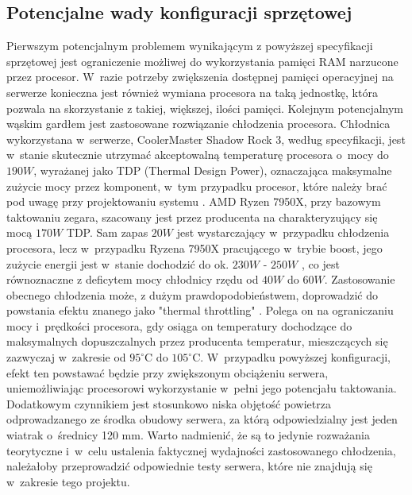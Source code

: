 \subsection{Potencjalne wady konfiguracji sprzętowej}
Pierwszym potencjalnym problemem wynikającym z powyższej specyfikacji sprzętowej jest ograniczenie możliwej do wykorzystania pamięci RAM narzucone przez procesor. W~razie potrzeby zwiększenia dostępnej pamięci operacyjnej na serwerze konieczna jest również wymiana procesora na taką jednostkę, która pozwala na skorzystanie z takiej, większej, ilości pamięci. Kolejnym potencjalnym wąskim gardłem jest zastosowane rozwiązanie chłodzenia procesora. Chłodnica wykorzystana w~serwerze, CoolerMaster Shadow Rock 3, według specyfikacji, jest w~stanie skutecznie utrzymać akceptowalną temperaturę procesora o~mocy do $190 W$, wyrażanej jako TDP (Thermal Design Power), oznaczająca maksymalne zużycie mocy przez komponent, w~tym przypadku procesor, które należy brać pod uwagę przy projektowaniu systemu \cite{intelTdp}. AMD Ryzen 7950X, przy bazowym taktowaniu zegara, szacowany jest przez producenta na charakteryzujący się mocą $170 W$ TDP. Sam zapas $20W$ jest wystarczający w~przypadku chłodzenia procesora, lecz w~przypadku Ryzena 7950X pracującego w~trybie boost, jego zużycie energii jest w~stanie dochodzić do ok. $230 W$ - $250 W$ \cite{amdPpt, testyMocy}, co jest równoznaczne z deficytem mocy chłodnicy rzędu od $40W$ do $60W$. Zastosowanie obecnego chłodzenia może, z dużym prawdopodobieństwem, doprowadzić do powstania efektu znanego jako "thermal throttling" \cite{throttling}. Polega on na ograniczaniu mocy i~prędkości procesora, gdy osiąga on temperatury dochodzące do maksymalnych dopuszczalnych przez producenta temperatur, mieszczących się zazwyczaj w~zakresie od $95^{\circ}\mathrm{C}$ do $105^{\circ}\mathrm{C}$. W~przypadku powyższej konfiguracji, efekt ten powstawać będzie przy zwiększonym obciążeniu serwera, uniemożliwiając procesorowi wykorzystanie w~pełni jego potencjału taktowania. Dodatkowym czynnikiem jest stosunkowo niska objętość powietrza odprowadzanego ze środka obudowy serwera, za którą odpowiedzialny jest jeden wiatrak o~średnicy 120 mm. Warto nadmienić, że są to jedynie rozważania teorytyczne i~w~celu ustalenia faktycznej wydajności zastosowanego chłodzenia, należałoby przeprowadzić odpowiednie testy serwera, które nie znajdują się w~zakresie tego projektu.

